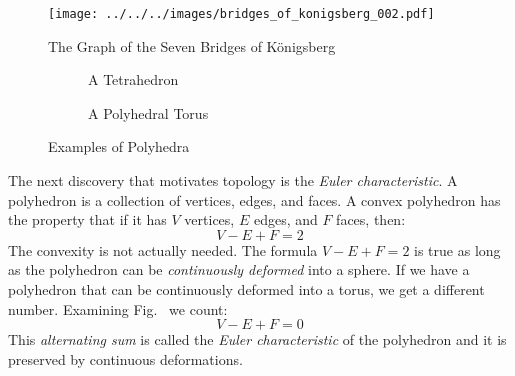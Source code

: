 \documentclass{article}
\theoremstyle{plain}
\theoremstyle{normal}
\begin{document}
        \begin{figure}
            \centering
            \texttt{[image: ../../../images/bridges\_of\_konigsberg\_002.pdf]}
            \caption{The Graph of the Seven Bridges of K\"{o}nigsberg}
            \label{fig:bridges_of_konigsberg_002}
        \end{figure}
        \begin{figure}
            \centering
            \begin{subfigure}[b]{0.34\textwidth}
                \centering
                \caption{A Tetrahedron}
                \label{fig:tetrahedron_001}
            \end{subfigure}
            \begin{subfigure}[b]{0.64\textwidth}
                \centering
                \caption{A Polyhedral Torus}
                \label{fig:polyhedral_torus_001}
            \end{subfigure}
            \caption{Examples of Polyhedra}
            \label{fig:polyhedra_example}
        \end{figure}
        \par\hfill\par
        The next discovery that motivates topology is the
        \textit{Euler characteristic}. A polyhedron is a collection of vertices,
        edges, and faces. A convex polyhedron has the property that if it has
        $V$ vertices, $E$ edges, and $F$ faces, then:
        \begin{equation}
            V-E+F=2
        \end{equation}
        The convexity is not actually needed. The formula $V-E+F=2$ is true as
        long as the polyhedron can be \textit{continuously deformed} into a
        sphere. If we have a polyhedron that can be continuously deformed into
        a torus, we get a different number. Examining
        Fig.~ we count:
        \begin{equation}
            V-E+F=0
        \end{equation}
        This \textit{alternating sum} is called the
        \textit{Euler characteristic}
        of the polyhedron and it is preserved by continuous deformations.
\end{document}
